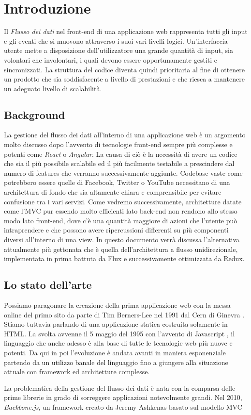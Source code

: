 \chapter{Introduzione}
Il \textit{Flusso dei dati} nel front-end di una applicazione web rappresenta tutti gli input e gli eventi che si muovono attraverso i suoi vari livelli logici.
Un'interfaccia utente mette a disposizione dell'utilizzatore una grande quantità di input, sia volontari che involontari, i quali devono essere opportunamente gestiti e sincronizzati. La struttura del codice diventa quindi prioritaria al fine di ottenere un prodotto che sia soddisfacente a livello di prestazioni e che riesca a mantenere un adeguato livello di scalabilità.

\section{Background}
La gestione del flusso dei dati all'interno di una applicazione web è un argomento molto discusso dopo l'avvento di tecnologie front-end sempre più complesse e potenti come \textit{React} o \textit{Angular}. La causa di ciò è la necessità di avere un codice che sia il più possibile scalabile ed il più facilmente testabile a prescindere dal numero di features che verranno successivamente aggiunte. 
Codebase vaste come potrebbero essere quelle di Facebook, Twitter o YouTube necessitano di una architettura di fondo che sia altamente chiara e comprensibile per evitare confusione tra i vari servizi.
Come vedremo successivamente, architetture datate come l'MVC pur essendo molto efficienti lato back-end non rendono allo stesso modo lato front-end, dove c'è una quantità maggiore di azioni che l'utente può intraprendere e che possono avere ripercussioni differenti su più componenti diversi all'interno di una view.
In questo documento verrà discussa l'alternativa attualmente più gettonata che è quella dell'architettura a flusso unidirezionale, implementata in prima battuta da Flux e successivamente ottimizzata da Redux.

\section{Lo stato dell'arte}
Possiamo paragonare la creazione della prima applicazione web con la messa online del primo sito da parte di Tim Berners-Lee nel 1991 dal Cern di Ginevra \cite{HuffingtonpostFirstWebsite}. Stiamo tuttavia parlando di una applicazione statica costruita solamente in HTML. La svolta avvenne il 5 maggio del 1995 con l'avvento di Javascript \cite{W3cJavascriptHistory}, il linguaggio che anche adesso è alla base di tutte le tecnologie web più nuove e potenti. Da qui in poi l'evoluzione è andata avanti in maniera esponenziale partendo da un utilizzo banale del linguaggio fino a giungere alla situazione attuale con framework ed architetture complesse.

La problematica della gestione del flusso dei dati è nata con la comparsa delle prime librerie in grado di sorreggere applicazioni notevolmente grandi. Nel 2010, \textit{Backbone.js}, un framework creato da Jeremy Ashkenas basato sul modello MVC